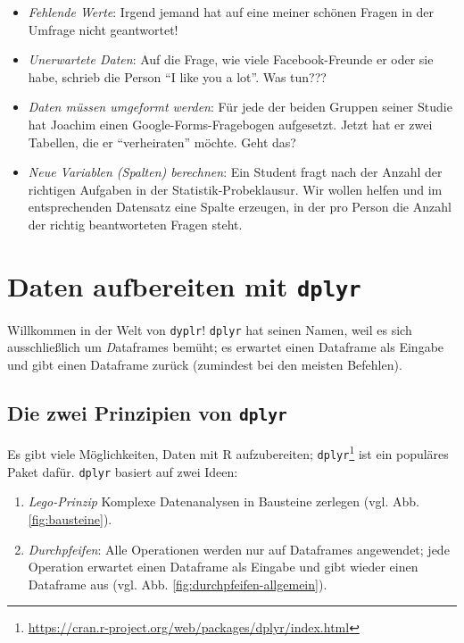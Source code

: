 \documentclass[12pt,ngerman,]{book}
\providecommand{\tightlist}{%
  \setlength{\itemsep}{0pt}\setlength{\parskip}{0pt}}
\let\rmarkdownfootnote\footnote%
\def\footnote{\protect\rmarkdownfootnote}
\begin{document}
\begin{itemize}
\tightlist
\item
  \emph{Fehlende Werte}: Irgend jemand hat auf eine meiner schönen
  Fragen in der Umfrage nicht geantwortet!
\item
  \emph{Unerwartete Daten}: Auf die Frage, wie viele Facebook-Freunde er
  oder sie habe, schrieb die Person ``I like you a lot''. Was tun???
\item
  \emph{Daten müssen umgeformt werden}: Für jede der beiden Gruppen
  seiner Studie hat Joachim einen Google-Forms-Fragebogen aufgesetzt.
  Jetzt hat er zwei Tabellen, die er ``verheiraten'' möchte. Geht das?
\item
  \emph{Neue Variablen (Spalten) berechnen}: Ein Student fragt nach der
  Anzahl der richtigen Aufgaben in der Statistik-Probeklausur. Wir
  wollen helfen und im entsprechenden Datensatz eine Spalte erzeugen, in
  der pro Person die Anzahl der richtig beantworteten Fragen steht.
\end{itemize}

\section{\texorpdfstring{Daten aufbereiten mit
\texttt{dplyr}}{Daten aufbereiten mit dplyr}}\label{daten-aufbereiten-mit-dplyr}

Willkommen in der Welt von \texttt{dyplr}! \texttt{dplyr} hat seinen
Namen, weil es sich ausschließlich um \emph{D}ataframes bemüht; es
erwartet einen Dataframe als Eingabe und gibt einen Dataframe zurück
(zumindest bei den meisten Befehlen).

\subsection{\texorpdfstring{Die zwei Prinzipien von
\texttt{dplyr}}{Die zwei Prinzipien von dplyr}}\label{die-zwei-prinzipien-von-dplyr}

Es gibt viele Möglichkeiten, Daten mit R aufzubereiten;
\texttt{dplyr}\footnote{\url{https://cran.r-project.org/web/packages/dplyr/index.html}}
ist ein populäres Paket dafür. \texttt{dplyr} basiert auf zwei Ideen:

\begin{enumerate}
\def\labelenumi{\arabic{enumi}.}
\tightlist
\item
  \emph{Lego-Prinzip} Komplexe Datenanalysen in Bausteine zerlegen (vgl.
  Abb. \ref{fig:bausteine}).
\item
  \emph{Durchpfeifen}: Alle Operationen werden nur auf Dataframes
  angewendet; jede Operation erwartet einen Dataframe als Eingabe und
  gibt wieder einen Dataframe aus (vgl. Abb.
  \ref{fig:durchpfeifen-allgemein}).
\end{enumerate}
\end{document}
